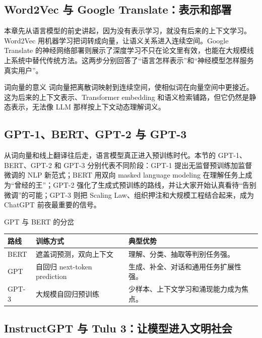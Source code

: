 \documentclass[a4paper]{article}
\begin{document}
\subsection{Word2Vec 与 Google Translate：表示和部署}

本章先从语言模型的前史讲起，因为没有表示学习，就没有后来的上下文学习。Word2Vec 用机器学习把词转成向量，让语义关系进入连续空间。Google Translate 的神经网络部署则展示了深度学习不只在论文里有效，也能在大规模线上系统中替代传统方法。这两步分别回答了“语言怎样表示”和“神经模型怎样服务真实用户”。

\begin{importantbox}{词向量的意义}
词向量把离散词映射到连续空间，使相似词在向量空间中更接近。这为后来的上下文表示、Transformer embedding 和语义检索铺路，但它仍然是静态表示，无法像 LLM 那样按上下文动态理解词义。
\end{importantbox}

\subsection{GPT-1、BERT、GPT-2 与 GPT-3}

从词向量和线上翻译往后走，语言模型真正进入预训练时代。本节的 GPT-1、BERT、GPT-2 和 GPT-3 分别代表不同阶段：GPT-1 提出无监督预训练加监督微调的 NLP 新范式；BERT 用双向 masked language modeling 在理解任务上成为“曾经的王”；GPT-2 强化了生成式预训练的路线，并让大家开始认真看待“告别微调”的可能；GPT-3 则把 Scaling Law、组织押注和大规模工程结合起来，成为 ChatGPT 前夜最重要的信号。

\begin{knowledgebox}{GPT 与 BERT 的分岔}
\begin{tabularx}{\textwidth}{p{}p{}X}
\toprule
路线 & 训练方式 & 典型优势 \\
\midrule
BERT & 遮盖词预测，双向上下文 & 理解、分类、抽取等判别任务强。 \\
GPT & 自回归 next-token prediction & 生成、补全、对话和通用任务扩展性强。 \\
GPT-3 & 大规模自回归预训练 & 少样本、上下文学习和涌现能力成为焦点。 \\
\bottomrule
\end{tabularx}
\end{knowledgebox}

\subsection{InstructGPT 与 Tulu 3：让模型进入文明社会}
\end{document}
